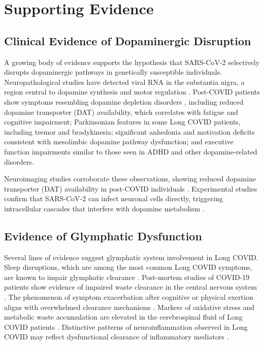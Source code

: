 \documentclass[12pt]{article}
\begin{document}
\section{Supporting Evidence}

\subsection{Clinical Evidence of Dopaminergic Disruption}

A growing body of evidence supports the hypothesis that SARS-CoV-2 selectively disrupts dopaminergic pathways in genetically susceptible individuals. Neuropathological studies have detected viral RNA in the substantia nigra, a region central to dopamine synthesis and motor regulation \citep{song2021neuroinvasion}. Post-COVID patients show symptoms resembling dopamine depletion disorders \citep{brundin2020parkinsonmanagement, devine2022parkinsonscovid}, including reduced dopamine transporter (DAT) availability, which correlates with fatigue and cognitive impairment; Parkinsonian features in some Long COVID patients, including tremor and bradykinesia; significant anhedonia and motivation deficits consistent with mesolimbic dopamine pathway dysfunction; and executive function impairments similar to those seen in ADHD and other dopamine-related disorders.

Neuroimaging studies corroborate these observations, showing reduced dopamine transporter (DAT) availability in post-COVID individuals \citep{lee2024dopamineinfection}. Experimental studies confirm that SARS-CoV-2 can infect neuronal cells directly, triggering intracellular cascades that interfere with dopamine metabolism \citep{cappelletti2023dopamineblock}.

\subsection{Evidence of Glymphatic Dysfunction}

Several lines of evidence suggest glymphatic system involvement in Long COVID. Sleep disruptions, which are among the most common Long COVID symptoms, are known to impair glymphatic clearance \citep{Xie2013}. Post-mortem studies of COVID-19 patients show evidence of impaired waste clearance in the central nervous system \citep{Thakur2021}. The phenomenon of symptom exacerbation after cognitive or physical exertion aligns with overwhelmed clearance mechanisms \citep{Pimentel2022}. Markers of oxidative stress and metabolic waste accumulation are elevated in the cerebrospinal fluid of Long COVID patients \citep{Frontera2022}. Distinctive patterns of neuroinflammation observed in Long COVID may reflect dysfunctional clearance of inflammatory mediators \citep{Fernandez-Castaneda2022}.
\end{document}
